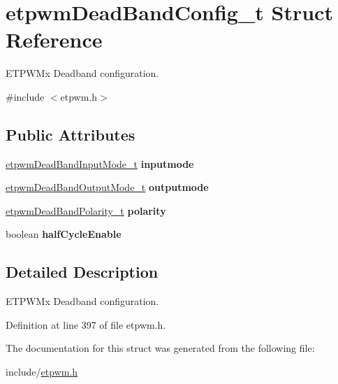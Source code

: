 \hypertarget{structetpwmDeadBandConfig__t}{}\section{etpwm\+Dead\+Band\+Config\+\_\+t Struct Reference}
\label{structetpwmDeadBandConfig__t}


E\+T\+P\+W\+Mx Deadband configuration.  




{\ttfamily \#include $<$etpwm.\+h$>$}

\subsection*{Public Attributes}
\begin{DoxyCompactItemize}
\item 
\mbox{\label{structetpwmDeadBandConfig__t_abe09094db7dcb9cf539900bb14df394a}} 
\mbox{\hyperlink{etpwm_8h_ac6e3d8beae74e80d85628511a3894b4f}{etpwm\+Dead\+Band\+Input\+Mode\+\_\+t}} {\bfseries inputmode}
\item 
\mbox{\label{structetpwmDeadBandConfig__t_a719d5b8f3acc996dcd6f11c709fabf45}} 
\mbox{\hyperlink{etpwm_8h_a85fe8cd2cc22ef23154d204e896a2d04}{etpwm\+Dead\+Band\+Output\+Mode\+\_\+t}} {\bfseries outputmode}
\item 
\mbox{\label{structetpwmDeadBandConfig__t_a9af375627fc4b480e5e9132295888cd1}} 
\mbox{\hyperlink{etpwm_8h_aa9a94c9cc21c399f40bd91ced0554b5b}{etpwm\+Dead\+Band\+Polarity\+\_\+t}} {\bfseries polarity}
\item 
\mbox{\label{structetpwmDeadBandConfig__t_a5e93ecb72894e7f28d3ce314ff589bad}} 
boolean {\bfseries half\+Cycle\+Enable}
\end{DoxyCompactItemize}


\subsection{Detailed Description}
E\+T\+P\+W\+Mx Deadband configuration. 

Definition at line 397 of file etpwm.\+h.



The documentation for this struct was generated from the following file\+:\begin{DoxyCompactItemize}
\item 
include/\mbox{\hyperlink{etpwm_8h}{etpwm.\+h}}\end{DoxyCompactItemize}
